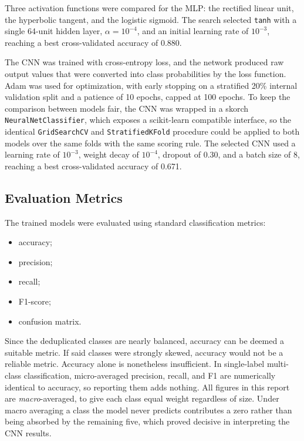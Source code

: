 \documentclass[conference]{IEEEtran}
\begin{document}
Three activation functions were compared for the MLP: the rectified linear unit,
the hyperbolic tangent, and the logistic sigmoid. 
The search selected \texttt{tanh} with a single 64-unit hidden layer,
$\alpha = 10^{-4}$, and an initial learning rate of $10^{-3}$, reaching a best
cross-validated accuracy of 0.880.

The CNN was trained with cross-entropy loss, and the network produced raw output values that were converted into class probabilities by the loss function.
Adam was used for optimization, with early stopping on a stratified
20\% internal validation split and a patience of 10 epochs, capped at 100 epochs.
To keep the comparison between models fair, the CNN was wrapped in a
skorch \cite{b7} \texttt{NeuralNetClassifier}, which exposes a scikit-learn
compatible interface, so the identical \texttt{GridSearchCV} and
\texttt{StratifiedKFold} procedure could be applied to both models over the same
folds with the same scoring rule. The selected CNN used a learning rate of
$10^{-3}$, weight decay of $10^{-4}$, dropout of 0.30, and a batch size of 8,
reaching a best cross-validated accuracy of 0.671.

\subsection{Evaluation Metrics}
The trained models were evaluated using standard classification metrics:

\begin{itemize}
    \item accuracy;
    \item precision;
    \item recall;
    \item F1-score;
    \item confusion matrix.
\end{itemize}

Since the deduplicated classes are nearly balanced, accuracy can be deemed a suitable metric. 
If said classes were strongly skewed, accuracy would not be a reliable metric.
Accuracy alone is nonetheless insufficient. In single-label multi-class
classification, micro-averaged precision, recall, and F1 are numerically
identical to accuracy, so reporting them adds nothing. All figures in this
report are \emph{macro}-averaged, to give each class equal weight
regardless of size. Under macro averaging a class the model never predicts
contributes a zero rather than being absorbed by the remaining five, which proved
decisive in interpreting the CNN results.
\end{document}
